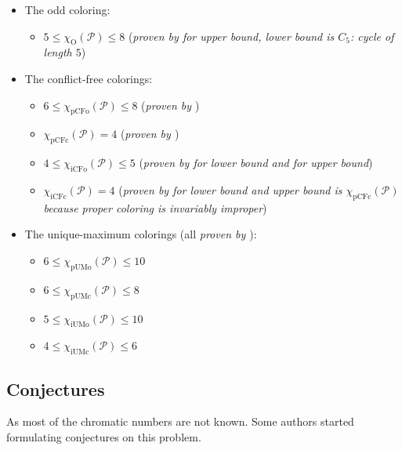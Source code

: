\documentclass{article}
\begin{document}
\begin{itemize}
	\item The odd coloring:
	\begin{itemize}
		\item $5 \leq \chi_{\mathrm{O}}(\mathcal{P}) \leq 8$ (\textit{proven by \cite{petr2023odd} for upper bound, lower bound is $\mathit{C_5}$: cycle of length $5$})
	\end{itemize}
	
	\item The conflict-free colorings:
	\begin{itemize}
		\item $6 \leq \chi_{\mathrm{pCFo}}(\mathcal{P}) \leq 8$ (\textit{proven by \cite{fabrici2023proper}})
		\item $\chi_{\mathrm{pCFc}}(\mathcal{P}) = 4$ (\textit{proven by \cite{appel1976every}})
		\item $4 \le \chi_{\mathrm{iCFo}}(\mathcal{P}) \le 5$ (\textit{proven by \cite{abel2018conflict} for lower bound and \cite{huang2020short} for upper bound})
		\item $\chi_{\mathrm{iCFc}}(\mathcal{P}) = 4$ (\textit{proven by \cite{Malik2023thesis} for lower bound and upper bound is $\mathit{\chi_{\mathrm{pCFc}}(\mathcal{P})}$ because proper coloring is invariably improper})
	\end{itemize}
	
	\item The unique-maximum colorings (all \textit{proven by \cite{fabrici2023proper}}):
	\begin{itemize}
		\item $6 \leq \chi_{\mathrm{pUMo}}(\mathcal{P}) \leq 10$
		\item $6 \leq \chi_{\mathrm{pUMc}}(\mathcal{P}) \leq 8$
		\item $5 \le \chi_{\mathrm{iUMo}}(\mathcal{P}) \le 10$
		\item $4 \le \chi_{\mathrm{iUMc}}(\mathcal{P}) \le 6$
	\end{itemize}
\end{itemize}



\subsection{Conjectures}
\label{sect:Conjectures}

As most of the chromatic numbers are not known. Some authors started formulating conjectures on this problem.
\end{document}
